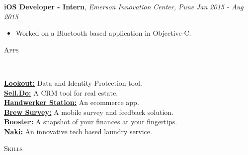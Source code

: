 \documentclass[9pt]{article}
\newenvironment{changemargin}[2]{%
  \begin{list}{}{%
    \setlength{\topsep}{0pt}%
    \setlength{\leftmargin}{#1}%
    \setlength{\rightmargin}{#2}%
    \setlength{\listparindent}{\parindent}%
    \setlength{\itemindent}{\parindent}%
    \setlength{\parsep}{\parskip}%
  }%
  \item[]}{\end{list}
}
\newcommand{\lineover}{
    \begin{changemargin}{-0.05in}{-0.05in}
        \vspace*{-8pt}
        \hrulefill \\
        \vspace*{-2pt}
    \end{changemargin}
}
\newcommand{\header}[1]{
    \begin{changemargin}{-0.5in}{-0.5in}
        \scshape{#1}\\
    \lineover
    \end{changemargin}
}
\newenvironment{body} {
    \vspace*{-16pt}
    \begin{changemargin}{-0.25in}{-0.5in}
  }
    {\end{changemargin}
}
\begin{document}
\begin{body}
    \vspace{14pt}
    \textbf{iOS Developer - Intern}, \emph{Emerson Innovation Center, Pune} \hfill \emph{Jan 2015 - Aug 2015}\\
    \vspace*{-4pt}
    \begin{itemize} \itemsep -0pt  %
        \item Worked on a Bluetooth based application in Objective-C.
    \end{itemize}

\end{body}

\smallskip


\header{Apps}

\begin{body}
    \vspace{14pt}
    \href{https://apps.apple.com/us/app/mobile-security-lookout/id434893913}{\textbf{Lookout:}}{} Data and Identity Protection tool. \\
    \vspace{2pt}
    \href{https://apps.apple.com/us/app/sell-do/id1225486345}{\textbf{Sell.Do:}}{} A CRM tool for real estate. \\
    \vspace*{2pt}
    \href{https://apps.apple.com/us/app/handwerkerstation/id1247972146}{\textbf{Handwerker Station:}}{} An ecommerce app. \\
    \vspace*{2pt}
    \href{https://apps.apple.com/us/app/brew-survey-offline-feedback/id1207197946}{\textbf{Brew Survey:}}{} A mobile survey and feedback solution. \\
    \vspace*{2pt}
    \href{https://itunes.apple.com/nz/app/booster-nz/id1179170506?mt=8}{\textbf{Booster:}}{} A snapshot of your finances at your fingertips. \\
    \vspace*{2pt}
    \href{https://itunes.apple.com/in/app/naki-laundry/id621934237?mt=8}{\textbf{Naki:}}{} An innovative tech based laundry service. \\
\end{body}

\newpage{}


\header{Skills}
\end{document}
